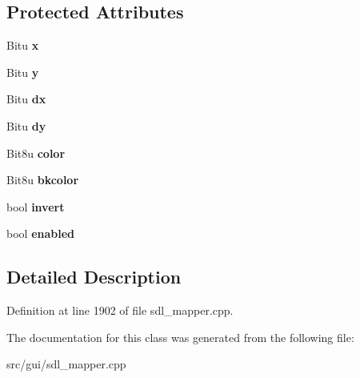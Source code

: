 \subsection*{Protected Attributes}
\begin{DoxyCompactItemize}
\item 
\hypertarget{classCButton_a31c9a5bc0e54382407372236ef0fce68}{Bitu {\bfseries x}}\label{classCButton_a31c9a5bc0e54382407372236ef0fce68}

\item 
\hypertarget{classCButton_a6be6467fc0eb283d33caa042c6c2bfbe}{Bitu {\bfseries y}}\label{classCButton_a6be6467fc0eb283d33caa042c6c2bfbe}

\item 
\hypertarget{classCButton_a0d46295304a83ce1a81fc42056ae3959}{Bitu {\bfseries dx}}\label{classCButton_a0d46295304a83ce1a81fc42056ae3959}

\item 
\hypertarget{classCButton_a6bb4df5cec766a3675bf3365927ff45f}{Bitu {\bfseries dy}}\label{classCButton_a6bb4df5cec766a3675bf3365927ff45f}

\item 
\hypertarget{classCButton_acf415cea0b3968f10393d204a0c4f4ec}{Bit8u {\bfseries color}}\label{classCButton_acf415cea0b3968f10393d204a0c4f4ec}

\item 
\hypertarget{classCButton_a34acf521fa23393acf3aa72b627489e6}{Bit8u {\bfseries bkcolor}}\label{classCButton_a34acf521fa23393acf3aa72b627489e6}

\item 
\hypertarget{classCButton_a8b3db5e11eaef4d5b539493abfcf0db9}{bool {\bfseries invert}}\label{classCButton_a8b3db5e11eaef4d5b539493abfcf0db9}

\item 
\hypertarget{classCButton_a4037c6c6e9cce44e38d21c4f87925193}{bool {\bfseries enabled}}\label{classCButton_a4037c6c6e9cce44e38d21c4f87925193}

\end{DoxyCompactItemize}


\subsection{Detailed Description}


Definition at line 1902 of file sdl\-\_\-mapper.\-cpp.



The documentation for this class was generated from the following file\-:\begin{DoxyCompactItemize}
\item 
src/gui/sdl\-\_\-mapper.\-cpp\end{DoxyCompactItemize}
